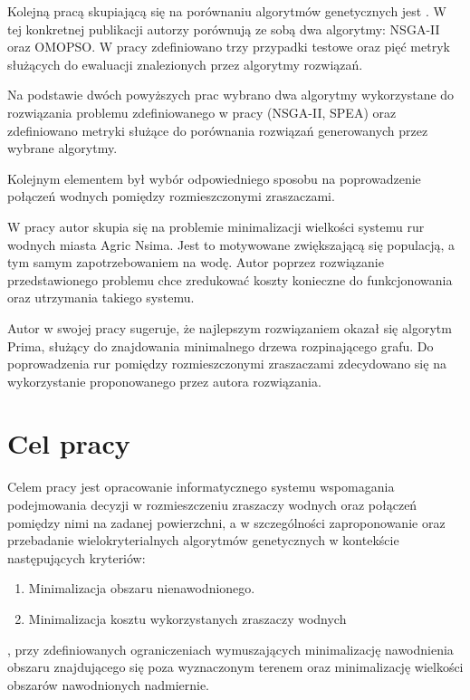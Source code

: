 \documentclass[twoside]{iisthesis}
\begin{document}
Kolejną pracą skupiającą się na porównaniu algorytmów genetycznych jest \cite{comparison_2}. W tej konkretnej publikacji autorzy porównują ze sobą dwa algorytmy: NSGA-II oraz OMOPSO. W pracy zdefiniowano trzy przypadki testowe oraz pięć metryk służących do ewaluacji znalezionych przez algorytmy rozwiązań.

Na podstawie dwóch powyższych prac wybrano dwa algorytmy wykorzystane do rozwiązania problemu zdefiniowanego w pracy (NSGA-II, SPEA) oraz zdefiniowano metryki służące do porównania rozwiązań generowanych przez wybrane algorytmy.

Kolejnym elementem był wybór odpowiedniego sposobu na poprowadzenie połączeń wodnych pomiędzy rozmieszczonymi zraszaczami.

W pracy \cite{pipes} autor skupia się na problemie minimalizacji wielkości systemu rur wodnych miasta Agric Nsima. Jest to motywowane zwiększającą się populacją, a tym samym zapotrzebowaniem na wodę. Autor poprzez rozwiązanie przedstawionego problemu chce zredukować koszty konieczne do funkcjonowania oraz utrzymania takiego systemu.

Autor w swojej pracy sugeruje, że najlepszym rozwiązaniem okazał się algorytm Prima, służący do znajdowania minimalnego drzewa rozpinającego grafu. Do poprowadzenia rur pomiędzy rozmieszczonymi zraszaczami zdecydowano się na wykorzystanie proponowanego przez autora rozwiązania.

\section{Cel pracy}
Celem pracy jest opracowanie informatycznego systemu wspomagania podejmowania decyzji w rozmieszczeniu zraszaczy wodnych oraz połączeń pomiędzy nimi na zadanej powierzchni, a w szczególności zaproponowanie oraz przebadanie wielokryterialnych algorytmów genetycznych w kontekście następujących kryteriów:\\
\begin{enumerate}
	\item Minimalizacja obszaru nienawodnionego.
	\item Minimalizacja kosztu wykorzystanych zraszaczy wodnych\\
\end{enumerate}
, przy zdefiniowanych ograniczeniach wymuszających minimalizację nawodnienia obszaru znajdującego się poza wyznaczonym terenem oraz minimalizację wielkości obszarów nawodnionych nadmiernie.
\end{document}
